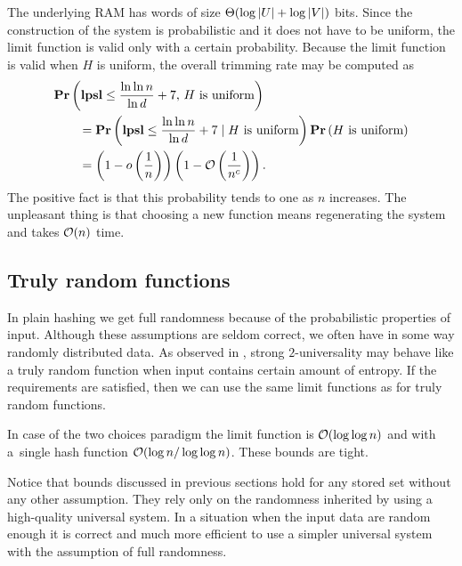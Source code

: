 The underlying RAM has words of size $\mathrm{\Theta}(\log |U| + \log |V|)$ bits. Since the construction of the system is probabilistic and it does not have to be uniform, the limit function is valid only with a certain probability. Because the limit function is valid when $H$ is uniform, the overall trimming rate may be computed as
\[
\begin{split} 
& \mathbf{Pr}\left(\mathbf{lpsl} \leq \frac{\ln \ln n}{\ln d} + 7,\, H \mbox{ is uniform}\right) \\
	& \qquad = \mathbf{Pr}\left(\mathbf{lpsl} \leq \frac{\ln \ln n}{\ln d} + 7 \mid H \mbox{ is uniform}\right) \mathbf{Pr}\left(H \mbox{ is uniform}\right) \\ 
	& \qquad = \left(1 - o\left(\frac{1}{n}\right)\right)\left(1 - \mathcal{O}\left(\frac{1}{n^c}\right)\right). \\
\end{split}
\]
The positive fact is that this probability tends to one as $n$ increases. The unpleasant thing is that choosing a new function means regenerating the system and takes $\mathcal{O}(n)$ time.

\subsection{Truly random functions}
\label{subsection-truly-random-functions}
In plain hashing we get full randomness because of the probabilistic properties of input. Although these assumptions are seldom correct, we often have in some way randomly distributed data. As observed in \cite{DBLP:conf/soda/MitzenmacherV08}, strong $2$-universality may behave like a truly random function when input contains certain amount of entropy. If the requirements are satisfied, then we can use the same limit functions as for truly random functions.

In case of the two choices paradigm the limit function is $\mathcal{O}(\log \log n)$ and with a~single hash function $\mathcal{O}(\log n / \log \log n)$. These bounds are tight.

Notice that bounds discussed in previous sections hold for any stored set without any other assumption. They rely only on the randomness inherited by using a high-quality universal system. In a situation when the input data are random enough it is correct and much more efficient to use a simpler universal system with the assumption of full randomness.
